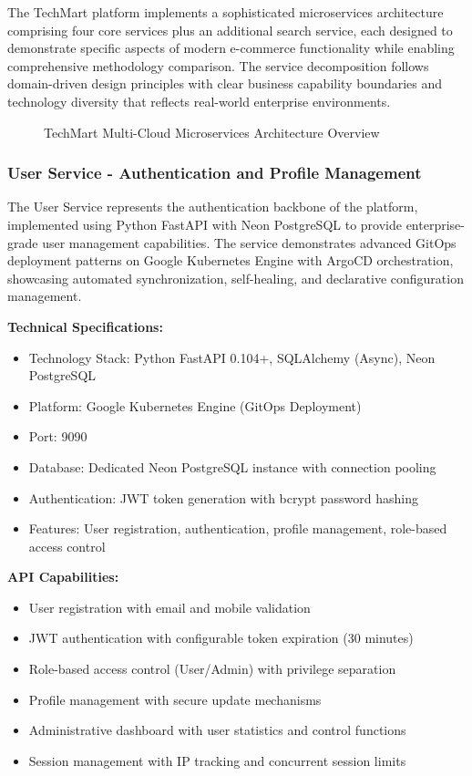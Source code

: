 The TechMart platform implements a sophisticated microservices architecture comprising four core services plus an additional search service, each designed to demonstrate specific aspects of modern e-commerce functionality while enabling comprehensive methodology comparison. The service decomposition follows domain-driven design principles with clear business capability boundaries and technology diversity that reflects real-world enterprise environments.

\begin{figure}[H]
\centering
\caption{TechMart Multi-Cloud Microservices Architecture Overview}
\label{fig:techmart-architecture-overview}
\end{figure}

\subsubsection{User Service - Authentication and Profile Management}

The User Service represents the authentication backbone of the platform, implemented using Python FastAPI with Neon PostgreSQL to provide enterprise-grade user management capabilities. The service demonstrates advanced GitOps deployment patterns on Google Kubernetes Engine with ArgoCD orchestration, showcasing automated synchronization, self-healing, and declarative configuration management.

\textbf{Technical Specifications:}
\begin{itemize}
\item Technology Stack: Python FastAPI 0.104+, SQLAlchemy (Async), Neon PostgreSQL
\item Platform: Google Kubernetes Engine (GitOps Deployment)
\item Port: 9090
\item Database: Dedicated Neon PostgreSQL instance with connection pooling
\item Authentication: JWT token generation with bcrypt password hashing
\item Features: User registration, authentication, profile management, role-based access control
\end{itemize}

\textbf{API Capabilities:}
\begin{itemize}
\item User registration with email and mobile validation
\item JWT authentication with configurable token expiration (30 minutes)
\item Role-based access control (User/Admin) with privilege separation
\item Profile management with secure update mechanisms
\item Administrative dashboard with user statistics and control functions
\item Session management with IP tracking and concurrent session limits
\end{itemize}

